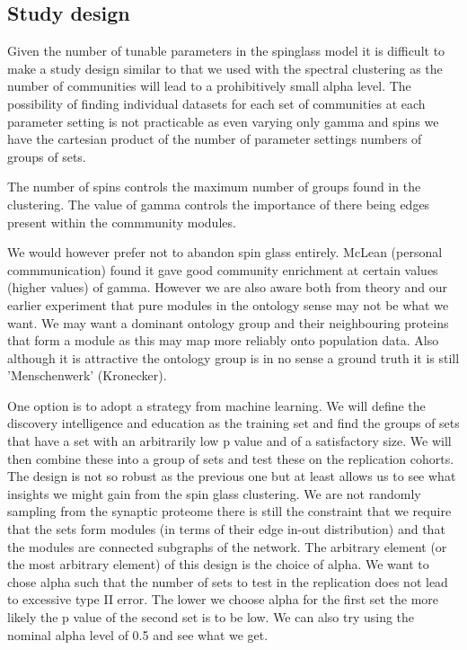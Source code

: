 \subsection{Study design}
Given the number of tunable parameters in the spinglass model it is difficult to make a study design similar to that we used with the spectral clustering as the number of communities will lead to a prohibitively small alpha level. The possibility of finding individual datasets for each set of communities at each parameter setting is not practicable as even varying only gamma and spins we have the cartesian product of the number of parameter settings numbers of groups of sets.

The number of spins controls the maximum number of groups found in the clustering. The value of gamma controls the importance of there being edges present within the commmunity modules.

We would however prefer not to abandon spin glass entirely. McLean (personal commmunication) found it gave good community enrichment at certain values (higher values) of gamma. However we are also aware both from theory and our earlier experiment that pure modules in the ontology sense may not be what we want. We may want a dominant ontology group and their neighbouring proteins that form a module as this may map more reliably onto population data. Also although it is attractive the ontology group is in no sense a ground truth it is still 'Menschenwerk' (Kronecker).

One option is to adopt a strategy from machine learning. We will define the discovery intelligence and education as the training set and find the groups of sets that have a set with an arbitrarily low p value and of a satisfactory size. We will then combine these into a group of sets and test these on the replication cohorts. The design is not so robust as the previous one but at least allows us to see what insights we might gain from the spin glass clustering. We are not randomly sampling from the synaptic proteome there is still the constraint that we require that the sets form modules (in terms of their edge in-out distribution) and that the modules are connected subgraphs of the network. The arbitrary element (or the most arbitrary element) of this design is the choice of alpha. We want to chose alpha such that the number of sets to test in the replication does not lead to excessive type II error. The lower we choose alpha for the first set the more likely the p value of the second set is to be low. We can also try using the nominal alpha level of 0.5 and see what we get. 

